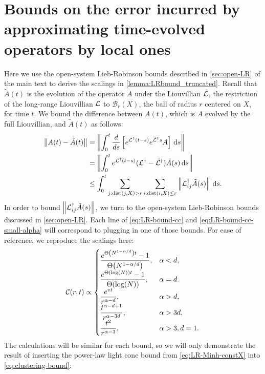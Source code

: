 \section{Bounds on the error incurred by approximating time-evolved operators by local ones}
\label{app:sim-local-obs}

Here we use the open-system Lieb-Robinson bounds described in \cref{sec:open-LR} of the main text to derive the scalings in \cref{lemma:LRbound_truncated}.
Recall that $\tilde A(t)$ is the evolution of the operator $A$ under the Liouvillian $\tilde {\mathcal{L}}$, the restriction of the long-range Liouvillian $\mathcal{L}$ to $\mathcal{B}_r(X)$, the ball of radius $r$ centered on $X$, for time $t$.
We bound the difference between $A(t)$, which is $A$ evolved by the full Liouvillian, and $\tilde A(t)$ as follows:
\begin{align}
  \left\|A(t)-\tilde A(t)\right\|&= \left\|\int_0^t \frac{d}{ds} \left[e^{\mathcal{L} ^\dagger(t-s)} e^{\tilde {\mathcal{L}}^\dagger s} A\right]\,\text{d}s\right\| \\
  &= \left\| \int_0^t e^{\mathcal{L}^\dagger (t-s)} (\mathcal{L}^\dagger-\tilde{\mathcal{L}}^\dagger)\tilde A(s)\,\text{d}s\right\| \\
  &\le \int_0^t \sum_{j:\text{dist}(j,X)>r} \sum_{i:\text{dist}(i,X)\le r} \left\|\mathcal{L}^\dagger_{ij} \tilde A(s)\right\|\,\text{d}s. \label{eq:clustering-bound}
\end{align}
In order to bound $\left\|\mathcal{L}^\dagger_{ij} \tilde A(s)\right\|$, we turn to the open-system Lieb-Robinson bounds discussed in \cref{sec:open-LR}.
Each line of \cref{eq:LR-bound-cc} and \cref{eq:LR-bound-cc-small-alpha} will correspond to plugging in one of those bounds.
For ease of reference, we reproduce the scalings here:
\begin{equation}
		\label{app:LR-bound-cc}
		\mathcal C(r,t) \propto \begin{cases}
        \ds \frac{e^{\Th{N^{1-\al/d}}t}-1}{\Th{N^{1-\al/d}}},& \al < d,
        \\ \ds \frac{e^{\Th{\log(N)}t}-1}{\Th{\log(N)}},& \al= d.
		\\ \ds \frac{e^{vt}}{r^{\al-d}},& \al > d,
		\\ \ds \frac{t^{\alpha-d+1}}{r^{\alpha-3d}},& \al > 3d,
		\\ \ds \frac{t^2}{r^{\alpha-3}},& \al > 3, d=1.
	\end{cases}
\end{equation}
The calculations will be similar for each bound, so we will only demonstrate the result of inserting the power-law light cone bound from \cref{eq:LR-Minh-constX} into \cref{eq:clustering-bound}:
